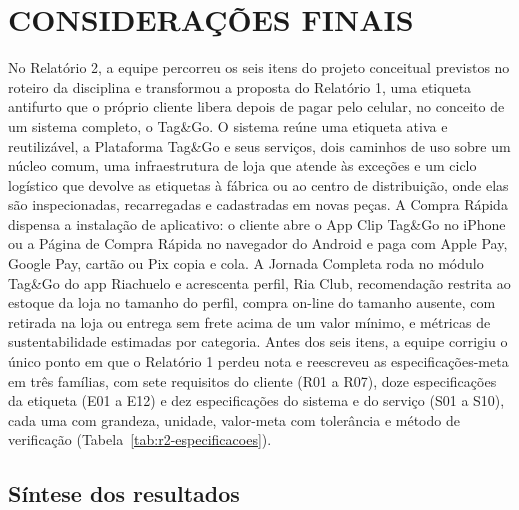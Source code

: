 
\section{CONSIDERAÇÕES FINAIS}
\label{sec:r2-consideracoes}

No Relatório 2, a equipe percorreu os seis itens do projeto conceitual previstos no roteiro da disciplina \cite{zancul2026conceitual} e transformou a proposta do Relatório 1, uma etiqueta antifurto que o próprio cliente libera depois de pagar pelo celular, no conceito de um sistema completo, o Tag\&Go. O sistema reúne uma etiqueta ativa e reutilizável, a Plataforma Tag\&Go e seus serviços, dois caminhos de uso sobre um núcleo comum, uma infraestrutura de loja que atende às exceções e um ciclo logístico que devolve as etiquetas à fábrica ou ao centro de distribuição, onde elas são inspecionadas, recarregadas e cadastradas em novas peças. A Compra Rápida dispensa a instalação de aplicativo: o cliente abre o App Clip Tag\&Go no iPhone ou a Página de Compra Rápida no navegador do Android e paga com Apple Pay, Google Pay, cartão ou Pix copia e cola. A Jornada Completa roda no módulo Tag\&Go do app Riachuelo e acrescenta perfil, Ria Club, recomendação restrita ao estoque da loja no tamanho do perfil, compra on-line do tamanho ausente, com retirada na loja ou entrega sem frete acima de um valor mínimo, e métricas de sustentabilidade estimadas por categoria. Antes dos seis itens, a equipe corrigiu o único ponto em que o Relatório 1 perdeu nota e reescreveu as especificações-meta em três famílias, com sete requisitos do cliente (R01 a R07), doze especificações da etiqueta (E01 a E12) e dez especificações do sistema e do serviço (S01 a S10), cada uma com grandeza, unidade, valor-meta com tolerância e método de verificação (Tabela~\ref{tab:r2-especificacoes}).

\subsection{Síntese dos resultados}

